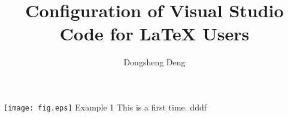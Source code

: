 \documentclass{article}
\author{Dongsheng Deng}
\title{Configuration of Visual Studio Code for LaTeX Users}
\begin{document}
\maketitle

\texttt{[image: fig.eps]}
Example 1
This is a first time.
dddf
\end{document}
